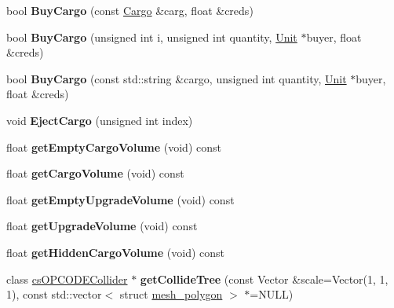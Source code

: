 \begin{DoxyCompactItemize}
\item 
bool {\bfseries Buy\+Cargo} (const \hyperlink{classCargo}{Cargo} \&carg, float \&creds)\hypertarget{classUnit_af00a3fd80f6f7d9c81c7d1fe5a768480}{}\label{classUnit_af00a3fd80f6f7d9c81c7d1fe5a768480}

\item 
bool {\bfseries Buy\+Cargo} (unsigned int i, unsigned int quantity, \hyperlink{classUnit}{Unit} $\ast$buyer, float \&creds)\hypertarget{classUnit_a5b7a27ba82a5343930da5b1732693b10}{}\label{classUnit_a5b7a27ba82a5343930da5b1732693b10}

\item 
bool {\bfseries Buy\+Cargo} (const std\+::string \&cargo, unsigned int quantity, \hyperlink{classUnit}{Unit} $\ast$buyer, float \&creds)\hypertarget{classUnit_aa24dd9b62a6eda3b1cd480475d9c5ddc}{}\label{classUnit_aa24dd9b62a6eda3b1cd480475d9c5ddc}

\item 
void {\bfseries Eject\+Cargo} (unsigned int index)\hypertarget{classUnit_a4193f63f04a7f827766ef285ebee688e}{}\label{classUnit_a4193f63f04a7f827766ef285ebee688e}

\item 
float {\bfseries get\+Empty\+Cargo\+Volume} (void) const \hypertarget{classUnit_ae9e050db18767b5e3d7f92022ee832a7}{}\label{classUnit_ae9e050db18767b5e3d7f92022ee832a7}

\item 
float {\bfseries get\+Cargo\+Volume} (void) const \hypertarget{classUnit_aee55ac6095415558ad6418f665270548}{}\label{classUnit_aee55ac6095415558ad6418f665270548}

\item 
float {\bfseries get\+Empty\+Upgrade\+Volume} (void) const \hypertarget{classUnit_a04ac19c5d60c4087e4ead22135da2e32}{}\label{classUnit_a04ac19c5d60c4087e4ead22135da2e32}

\item 
float {\bfseries get\+Upgrade\+Volume} (void) const \hypertarget{classUnit_ad216c815e031cafa03eb59a0747d14f2}{}\label{classUnit_ad216c815e031cafa03eb59a0747d14f2}

\item 
float {\bfseries get\+Hidden\+Cargo\+Volume} (void) const \hypertarget{classUnit_a35ae8f83ec2a2183a906eaecffd4b218}{}\label{classUnit_a35ae8f83ec2a2183a906eaecffd4b218}

\item 
class \hyperlink{classcsOPCODECollider}{cs\+O\+P\+C\+O\+D\+E\+Collider} $\ast$ {\bfseries get\+Collide\+Tree} (const Vector \&scale=Vector(1, 1, 1), const std\+::vector$<$ struct \hyperlink{structmesh__polygon}{mesh\+\_\+polygon} $>$ $\ast$=N\+U\+LL)\hypertarget{classUnit_affe092473f87417112b360867202fa70}{}\label{classUnit_affe092473f87417112b360867202fa70}


\end{DoxyCompactItemize}
